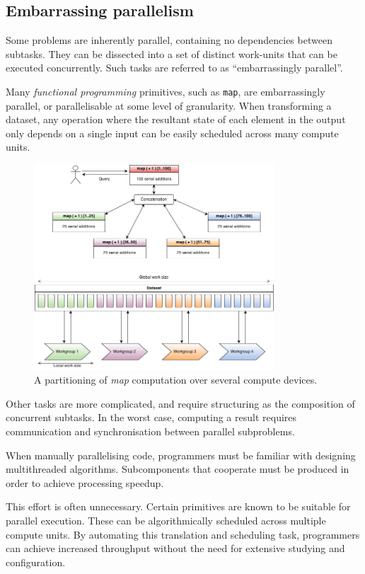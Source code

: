 \subsection{Embarrassing parallelism}
Some problems are inherently parallel, containing no dependencies between subtasks. They can be dissected into a set of distinct work-units that can be executed concurrently.
Such tasks are referred to as ``embarrassingly parallel''.

Many \emph{functional programming} primitives, such as \verb|map|, are embarrassingly parallel, or parallelisable at some level of granularity.
When transforming a dataset, any operation where the resultant state of each element in the output only depends on a single input can be easily scheduled across many compute units.

\begin{figure}[h]
  \includegraphics[width=0.8\textwidth]{./figures/map_task.png}
  \caption{A partitioning of \emph{map} computation over several compute devices.}
  \label{fig:map_task}
\end{figure}

Other tasks are more complicated, and require structuring as the composition of concurrent subtasks.
In the worst case, computing a result requires communication and synchronisation between parallel subproblems.

When manually parallelising code, programmers must be familiar with designing multithreaded algorithms. Subcomponents that cooperate must be produced in order to achieve processing speedup.

This effort is often unnecessary. Certain primitives are known to be suitable for parallel execution. These can be algorithmically scheduled across multiple compute units. By automating this translation and scheduling task, programmers can achieve increased throughput without the need for extensive studying and configuration.

